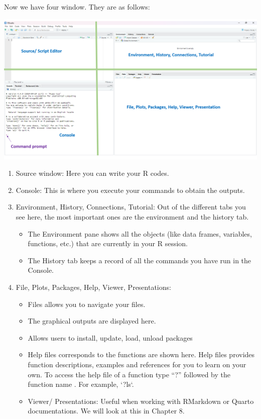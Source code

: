 \documentclass[
  letterpaper,
  DIV=11,
  numbers=noendperiod]{scrreprt}
\providecommand{\tightlist}{%
  \setlength{\itemsep}{0pt}\setlength{\parskip}{0pt}}\usepackage{longtable,booktabs,array}
\begin{document}
Now we have four window. They are as follows:

\includegraphics[width=5.33in,height=\textheight]{img/chap1/rw5.png}

\begin{enumerate}
\def\labelenumi{\arabic{enumi}.}
\tightlist
\item
  Source window: Here you can write your R codes.
\item
  Console: This is where you execute your commands to obtain the
  outputs.
\item
  Environment, History, Connections, Tutorial: Out of the different tabs
  you see here, the most important ones are the environment and the
  history tab.

  \begin{itemize}
  \item
    The Environment pane shows all the objects (like data frames,
    variables, functions, etc.) that are currently in your R session.
  \item
    The History tab keeps a record of all the commands you have run in
    the Console.
  \end{itemize}
\item
  File, Plots, Packages, Help, Viewer, Presentations:

  \begin{itemize}
  \item
    Files allows you to navigate your files.
  \item
    The graphical outputs are displayed here.
  \item
    Allows users to install, update, load, unload packages
  \item
    Help files corresponds to the functions are shown here. Help files
    provides function descriptions, examples and references for you to
    learn on your own. To access the help file of a function type ``?''
    followed by the function name . For example, `?ls`.
  \item
    Viewer/ Presentations: Useful when working with RMarkdown or Quarto
    documentations. We will look at this in Chapter 8.
  \end{itemize}
\end{enumerate}
\end{document}
